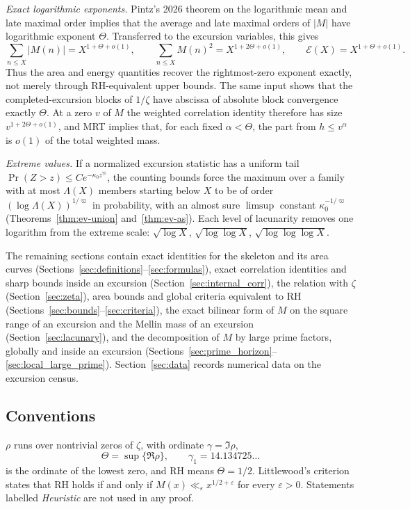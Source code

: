 \documentclass[11pt]{amsart}
\numberwithin{equation}{section}
\theoremstyle{plain}
\theoremstyle{definition}
\theoremstyle{remark}
\newcommand{\eps}{\varepsilon}
\newcommand{\En}{\mathcal{E}}
\begin{document}
\smallskip\noindent\emph{Exact logarithmic exponents.}
Pintz's 2026 theorem on the logarithmic mean and late maximal order implies that the average and late maximal
orders of $|M|$ have logarithmic exponent $\Theta$.  Transferred to the
excursion variables, this gives
\[
 \sum_{n\le X}|M(n)|=X^{1+\Theta+o(1)},\qquad
 \sum_{n\le X}M(n)^2=X^{1+2\Theta+o(1)},\qquad
 \En(X)=X^{1+\Theta+o(1)}.
\]
Thus the area and energy quantities recover the rightmost-zero exponent
exactly, not merely through RH-equivalent upper bounds.  The same input
shows that the completed-excursion blocks of $1/\zeta$ have abscissa of
absolute block convergence exactly $\Theta$.  At a zero $v$ of $M$ the
weighted correlation identity therefore has size $v^{1+2\Theta+o(1)}$, and
MRT implies that, for each fixed $\alpha<\Theta$, the part from
$h\le v^\alpha$ is $o(1)$ of the total weighted mass.

\smallskip\noindent\emph{Extreme values.} If a normalized excursion statistic
has a uniform tail $\Pr(Z>z)\le Ce^{-\kappa_0z^\varpi}$, the counting bounds force the
maximum over a family with at most $\Lambda(X)$ members starting below $X$ to be
of order $(\log \Lambda(X))^{1/\varpi}$ in probability, with an almost sure $\limsup$ constant
$\kappa_0^{-1/\varpi}$ (Theorems~\ref{thm:ev-union} and~\ref{thm:ev-as}). Each level of
lacunarity removes one logarithm from the extreme scale:
$\sqrt{\log X}$, $\sqrt{\log\log X}$, $\sqrt{\log\log\log X}$.

\smallskip
The remaining sections contain exact identities for the skeleton and its area
curves (Sections~\ref{sec:definitions}--\ref{sec:formulas}), exact
correlation identities and sharp bounds inside an excursion
(Section~\ref{sec:internal_corr}), the relation with $\zeta$
(Section~\ref{sec:zeta}), area bounds and global criteria equivalent to RH
(Sections~\ref{sec:bounds}--\ref{sec:criteria}), the exact bilinear form of
$M$ on the square range of an excursion and the Mellin mass of an excursion
(Section~\ref{sec:lacunary}), and the decomposition of $M$ by large prime
factors, globally and inside an excursion
(Sections~\ref{sec:prime_horizon}--\ref{sec:local_large_prime}).
Section~\ref{sec:data} records numerical data on the excursion census.

\subsection*{Conventions}
$\rho$ runs over nontrivial zeros of $\zeta$, with ordinate $\gamma=\Im\rho$,
\[
\Theta=\sup\{\Re\rho\},\qquad \gamma_1=14.134725\ldots
\]
is the ordinate of the lowest zero, and RH means $\Theta=1/2$. Littlewood's
criterion \cite[\S14.25]{Titchmarsh1986} states that RH holds if and only if
$M(x)\ll_\eps x^{1/2+\eps}$ for every $\eps>0$. Statements labelled
\emph{Heuristic} are not used in any proof.
\end{document}
